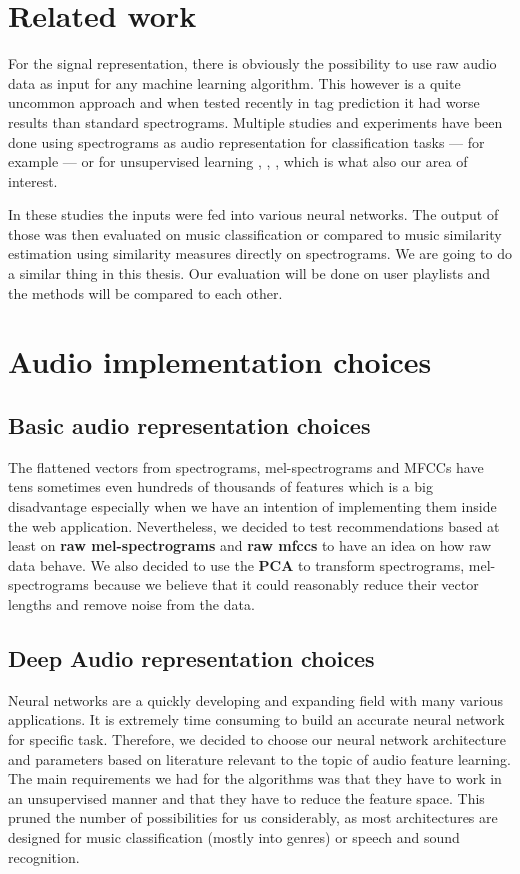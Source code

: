 \section{Related work}\label{sec:audio_related_work}
For the signal representation, there is obviously the possibility to use raw audio data as input for any machine learning algorithm. This however is a quite uncommon approach and when tested recently in tag prediction \cite{6854950} it had worse results than standard spectrograms. Multiple studies and experiments have been done using spectrograms as audio representation for classification tasks --- for example \cite{wang2014improving} --- or for unsupervised learning \cite{van2013deep}, \cite{Ramakrishnan2017song2V}, \cite{NIPS2009_3674}, which is what also our area of interest. 

In these studies the inputs were fed into various neural networks. The output of those was then evaluated on music classification or compared to music similarity estimation using similarity measures directly on spectrograms. We are going to do a similar thing in this thesis. Our evaluation will be done on user playlists and the methods will be compared to each other.

\section{Audio implementation choices}

\subsection{Basic audio representation choices}
The flattened vectors from spectrograms, mel-spectrograms and MFCCs have tens sometimes even hundreds of thousands of features which is a big disadvantage especially when we have an intention of implementing them inside the web application. Nevertheless, we decided to test recommendations based at least on \textbf{raw mel-spectrograms} and \textbf{raw mfccs} to have an idea on how raw data behave. We also decided to use the \textbf{PCA} to transform spectrograms, mel-spectrograms because we believe that it could reasonably reduce their vector lengths and remove noise from the data.


\subsection{Deep Audio representation choices}
Neural networks are a quickly developing and expanding field with many various applications. It is extremely time consuming to build an accurate neural network for specific task. Therefore, we decided to choose our neural network architecture and parameters based on literature relevant to the topic of audio feature learning. The main requirements we had for the algorithms was that they have to work in an unsupervised manner and that they have to reduce the feature space. This pruned the number of possibilities for us considerably, as most architectures are designed for music classification (mostly into genres) or speech and sound recognition. 

